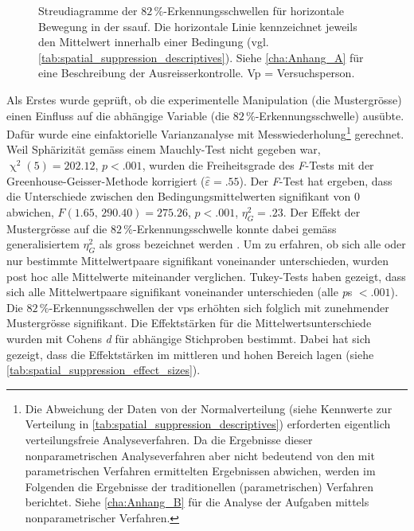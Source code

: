 \documentclass[11pt, twoside, a4paper]{book}		%
\begin{document}
\begin{figure}[p]
	\centering
	\begin{adjustbox}{width=1\textwidth} 
		
	\end{adjustbox}
	\caption[Streudiagramme der $82\,\%$-Erkennungsschwellen in der \gls{ssauf}]{Streudiagramme der $82\,\%$-Erkennungsschwellen für horizontale Bewegung in der \gls{ssauf}. Die horizontale Linie kennzeichnet jeweils den Mittelwert innerhalb einer Bedingung (vgl. \autoref{tab:spatial_suppression_descriptives}). Siehe \autoref{cha:Anhang_A} für eine Beschreibung der Ausreisserkontrolle. Vp = Versuchsperson.}
	\label{fig:spatial_suppression_scatterplot}
\end{figure}

Als Erstes wurde geprüft, ob die experimentelle Manipulation (die Mustergrösse) einen Einfluss auf die abhängige Variable (die $82\,\%$-Er\-ken\-nungs\-schwel\-le) ausübte. Dafür wurde eine einfaktorielle Varianzanalyse mit Messwiederholung\footnote{Die Abweichung der Daten von der Normalverteilung (siehe Kennwerte zur Verteilung in \autoref{tab:spatial_suppression_descriptives}) erforderten eigentlich verteilungsfreie Analyseverfahren. Da die Ergebnisse dieser nonparametrischen Analyseverfahren aber nicht bedeutend von den mit parametrischen Verfahren ermittelten Ergebnissen abwichen, werden im Folgenden die Ergebnisse der traditionellen (parametrischen) Verfahren berichtet. Siehe \autoref{cha:Anhang_B} für die Analyse der Aufgaben mittels nonparametrischer Verfahren.}
gerechnet. Weil Sphärizität gemäss einem Mauchly-Test nicht gegeben war, $\upchi^2(5)=202.12$, $p<.001$, wurden die Freiheitsgrade des \textit{F}-Tests mit der Greenhouse-Geisser-Methode korrigiert ($\hat{\varepsilon}=.55$).
Der \textit{F}-Test hat ergeben, dass die Unterschiede zwischen den Bedingungsmittelwerten signifikant von 0 abwichen, $F(1.65,\,290.40)=275.26$, $p<.001$, $\eta_{G}^2=.23$. Der Effekt der Mustergrösse auf die $82\,\%$-Erkennungsschwelle konnte dabei gemäss generalisiertem $\eta_{G}^2$ \citep{Olejnik2003} als gross bezeichnet werden \citep[S. 383]{Bakeman2005}.
Um zu erfahren, ob sich alle oder nur bestimmte Mittelwertpaare signifikant voneinander unterschieden, wurden post hoc alle Mittelwerte miteinander verglichen.
Tukey-Tests haben gezeigt, dass sich alle Mittelwertpaare signifikant voneinander unterschieden (alle \textit{p}s $<.001$).
Die $82\,\%$-Er\-ken\-nungs\-schwel\-len der \glspl{vp} erhöhten sich folglich mit zunehmender Mustergrösse signifikant.
Die Effektstärken für die Mittelwertsunterschiede wurden mit Cohens \textit{d} für abhängige Stichproben \citep{Gibbons1993} bestimmt. 
Dabei hat sich gezeigt, dass die Effektstärken im mittleren und hohen Bereich \citep[][S. 40]{Cohen1988} lagen (siehe \autoref{tab:spatial_suppression_effect_sizes}). 
\end{document}
